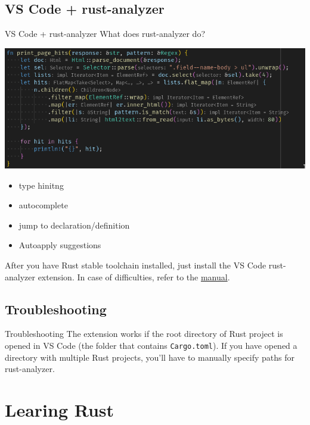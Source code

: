 \documentclass[
  9pt,
  ignorenonframetext,
]{beamer}
\newcommand{\passthrough}[1]{#1}
\providecommand{\tightlist}{%
  \setlength{\itemsep}{0pt}\setlength{\parskip}{0pt}}
\begin{document}
\hypertarget{vs-code-rust-analyzer}{%
\subsection{VS Code + rust-analyzer}\label{vs-code-rust-analyzer}}

\begin{frame}{VS Code + rust-analyzer}
What does rust-analyzer do?

\includegraphics{img/ra1.png}

\begin{itemize}
\tightlist
\item
  type hinitng
\item
  autocomplete
\item
  jump to declaration/definition
\item
  Autoapply suggestions
\end{itemize}

After you have Rust stable toolchain installed, just install the VS Code
rust-analyzer extension. In case of difficulties, refer to the
\href{https://rust-analyzer.github.io/manual.html\#vs-code}{manual}.
\end{frame}

\hypertarget{troubleshooting}{%
\subsection{Troubleshooting}\label{troubleshooting}}

\begin{frame}[fragile]{Troubleshooting}
The extension works if the root directory of Rust project is opened in
VS Code (the folder that contains \passthrough{\lstinline!Cargo.toml!}).
If you have opened a directory with multiple Rust projects, you'll have
to manually specify paths for rust-analyzer.
\end{frame}

\hypertarget{learing-rust}{%
\section{Learing Rust}\label{learing-rust}}
\end{document}
